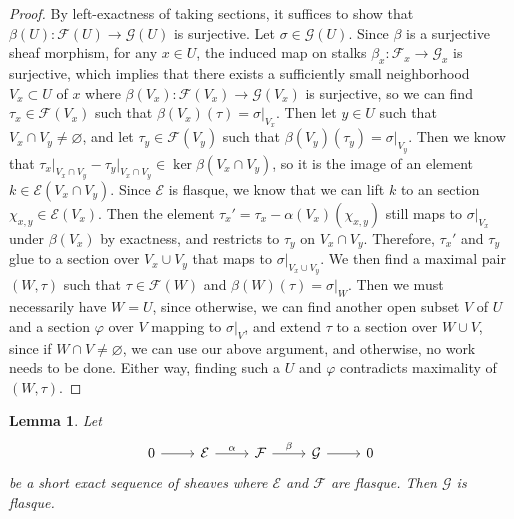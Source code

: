 \documentclass[psamsfonts, 12pt]{amsart}
\newtheorem{lem}[thm]{Lemma}
\theoremstyle{definition}
\theoremstyle{remark}
\renewcommand{\emptyset}{\varnothing}
\begin{document}
%
\begin{proof}
By left-exactness of taking sections, it suffices to show that
$\beta(U) : \mathcal{F}(U) \to \mathcal{G}(U)$ is surjective. Let
$\sigma \in \mathcal{G}(U)$. Since $\beta$ is a surjective sheaf morphism, for any
$x \in U$, the induced map on stalks $\beta_x : \mathcal{F}_x \to \mathcal{G}_x$ is
surjective, which implies that there exists a sufficiently small neighborhood
$V_x \subset U$ of $x$ where
$\beta(V_x) : \mathcal{F}(V_x) \to \mathcal{G}(V_x)$ is surjective,
so we can find $\tau_x \in \mathcal{F}(V_x)$ such that
$\beta(V_x)(\tau) = \sigma\vert_{V_x}$. Then let $y \in U$ such that
$V_x \cap V_y \neq \emptyset$, and let $\tau_y \in \mathcal{F}(V_y)$ such that
$\beta(V_y)(\tau_y) = \sigma\vert_{V_y}$. Then we know that
$\tau_x\vert_{V_x \cap V_y} - \tau_y\vert_{V_x \cap V_y} \in \ker\beta(V_x \cap V_y)$,
so it is the image of an element $k \in \mathcal{E}(V_x \cap V_y)$. Since $\mathcal{E}$
is flasque, we know that we can lift $k$ to an section $\chi_{x,y} \in \mathcal{E}(V_x)$.
Then the element $\tau_x' = \tau_x - \alpha(V_x)(\chi_{x,y})$ still maps to
$\sigma\vert_{V_x}$  under $\beta(V_x)$ by exactness, and restricts to $\tau_y$ on
$V_x \cap V_y$. Therefore, $\tau_x'$ and $\tau_y$ glue to a section over $V_x \cup V_y$
that maps to $\sigma\vert_{V_x \cup V_y}$.  We then find a maximal pair $(W, \tau)$ such
that $\tau \in \mathcal{F}(W)$ and $\beta(W)(\tau) = \sigma\vert_W$. Then we must
necessarily have $W = U$, since otherwise, we can find another open subset $V$ of $U$
and a section $\varphi$ over $V$ mapping to $\sigma\vert_V$, and extend $\tau$ to a
section over $W \cup V$, since if $W \cap V \neq \emptyset$, we can use our above
argument, and otherwise, no work needs to be done. Either way, finding such a $U$
and $\varphi$ contradicts maximality of $(W,\tau)$.
\end{proof}
%
\begin{lem}
Let
\[\begin{tikzcd}
0 \ar[r] & \mathcal{E} \ar[r,"\alpha"] & \mathcal{F} \ar[r,"\beta"]
& \mathcal{G} \ar[r] & 0
\end{tikzcd}\]
be a short exact sequence of sheaves where $\mathcal{E}$ and $\mathcal{F}$ are flasque.
Then $\mathcal{G}$ is flasque.
\end{lem}
%
\end{document}
